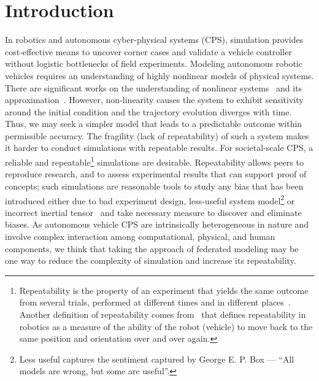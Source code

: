 \documentclass[aps,pra,twocolumn,notitlepage,nofootinbib,superscriptaddress]{revtex4-1}
\begin{document}
\section{Introduction}
\label{sec:intro}
In robotics and autonomous cyber-physical systems (CPS), simulation provides cost-effective means to uncover corner cases and validate a vehicle controller without logistic bottlenecks of field experiments. Modeling autonomous robotic vehicles requires an understanding of highly nonlinear models of physical systems. There are significant works on the understanding of nonlinear systems~\cite{khalil2002nonlinear,vidyasagar2002nonlinear,Perko1996} and its approximation~\cite{KAMYAD20051041, schilling2001approximation, palm1978representation, bouvrie2017kernel}. 
However, non-linearity causes the system to exhibit sensitivity around the initial condition and the trajectory evolution diverges with time. Thus, we may seek a simpler model that leads to a predictable outcome within permissible accuracy. 
The fragility (lack of repeatability) of such a system makes it harder to conduct simulations with repeatable results. For societal-scale CPS, a reliable and repeatable\footnote{
Repeatability is the property of an experiment that yields the same outcome from several trials, performed at different times and in different places~\cite{amigoni2014good}. Another definition of repeatability comes from~\cite{shiakolas2002accuracy} that defines repeatability in robotics as a measure of the ability of the robot (vehicle) to move back to the same position and orientation over and over again.} simulations are desirable. Repeatability allows peers to reproduce research, and to assess experimental results that can support proof of concepts; such simulations are reasonable tools to study any bias that has been introduced either due to bad experiment design, less-useful system model\footnote{Less useful captures the sentiment captured by George E. P. Box --- ``All models are wrong, but some are useful''.} or incorrect inertial tensor~\cite{cumin2015measuring} and take necessary measure to discover and eliminate biases. As autonomous vehicle CPS are intrinsically heterogeneous in nature and involve complex interaction among computational, physical, and human components, we think that taking the approach of federated modeling may be one way to reduce the complexity of simulation and increase its repeatability.
\end{document}
